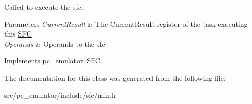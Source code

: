 Called to execute the sfc. 


\begin{DoxyParams}{Parameters}
{\em Current\+Result} & The Current\+Result register of the task executing this \hyperlink{classpc__emulator_1_1SFC}{S\+FC} \\
\hline
{\em Operands} & Operands to the sfc \\
\hline
\end{DoxyParams}


Implements \hyperlink{classpc__emulator_1_1SFC_ab206c80fc0e429c56672b4f6a0ca8635}{pc\+\_\+emulator\+::\+S\+FC}.



The documentation for this class was generated from the following file\+:\begin{DoxyCompactItemize}
\item 
src/pc\+\_\+emulator/include/sfc/min.\+h\end{DoxyCompactItemize}

